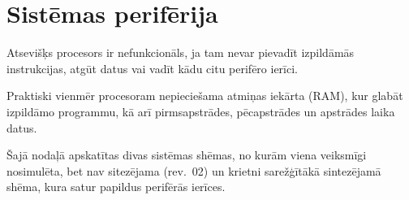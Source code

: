 \section{Sistēmas perifērija}
	Atsevišķs procesors ir nefunkcionāls, ja tam nevar pievadīt izpildāmās
	instrukcijas, atgūt datus vai vadīt kādu citu perifēro ierīci.
	
	Praktiski vienmēr procesoram nepieciešama atmiņas iekārta (RAM), kur
	glabāt izpildāmo programmu, kā arī pirmsapstrādes, pēcapstrādes un 
	apstrādes laika datus.
	
	Šajā nodaļā apskatītas divas sistēmas shēmas, no kurām viena veiksmīgi
	nosimulēta, bet nav sitezējama (rev.~02) un krietni sarežģītākā
	sintezējamā shēma, kura satur papildus perifērās ierīces.
	
	 \clearpage %
	 \clearpage %
	
